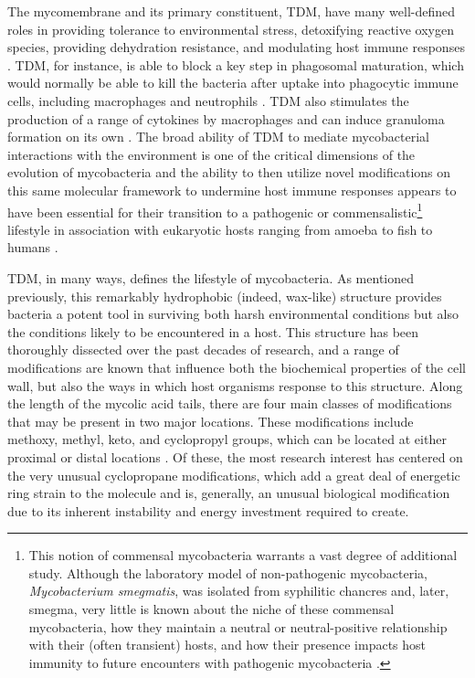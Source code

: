 The mycomembrane and its primary constituent, TDM, have many well\hyp{}defined roles in providing tolerance to environmental stress, detoxifying reactive oxygen species, providing dehydration resistance, and modulating host immune responses \citep{Lima2001, Ryll2001, Harland2008, Patin2017b, Asmar2016, Das2013a, Hunter2016}. TDM, for instance, is able to block a key step in phagosomal maturation, which would normally be able to kill the bacteria after uptake into phagocytic immune cells, including macrophages and neutrophils \citep{Axelrod2008, Indrigo2003, Spargo1991}. TDM also stimulates the production of a range of cytokines by macrophages and can induce granuloma formation on its own \citep{Korf2005}. The broad ability of TDM to mediate mycobacterial interactions with the environment is one of the critical dimensions of the evolution of mycobacteria and the ability to then utilize novel modifications on this same molecular framework to undermine host immune responses appears to have been essential for their transition to a pathogenic or commensalistic\footnote{This notion of commensal mycobacteria warrants a vast degree of additional study. Although the laboratory model of non\hyp{}pathogenic mycobacteria, \textit{Mycobacterium smegmatis}, was isolated from syphilitic chancres and, later, smegma, very little is known about the niche of these commensal mycobacteria, how they maintain a neutral or neutral\hyp{}positive relationship with their (often transient) hosts, and how their presence impacts host immunity to future encounters with pathogenic mycobacteria \citep{Robinson2018}.} lifestyle in association with eukaryotic hosts ranging from amoeba to fish to humans \citep{Hagedorn2009, Salah2009, Delafont2014, Honda2018, Falkinham2009}.

TDM, in many ways, defines the lifestyle of mycobacteria. As mentioned previously, this remarkably hydrophobic (indeed, wax\hyp{}like) structure provides bacteria a potent tool in surviving both harsh environmental conditions but also the conditions likely to be encountered in a host. This structure has been thoroughly dissected over the past decades of research, and a range of modifications are known that influence both the biochemical properties of the cell wall, but also the ways in which host organisms response to this structure. Along the length of the mycolic acid tails, there are four main classes of modifications that may be present in two major locations. These modifications include methoxy, methyl, keto, and cyclopropyl groups, which can be located at either proximal or distal locations \citep{Takayama2005, Rao2005, Rao2006, Bhatt2008, Sugawara2002, Walton2018, Barkan2009, Minnikin2002}. Of these, the most research interest has centered on the very unusual cyclopropane modifications, which add a great deal of energetic ring strain to the molecule and is, generally, an unusual biological modification due to its inherent instability and energy investment required to create.


